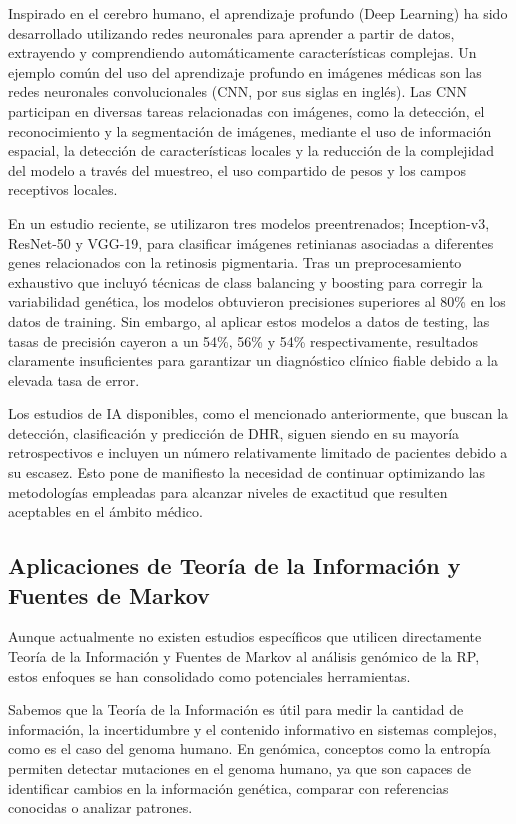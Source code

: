 \documentclass[11pt,spanish,listoffigures,listoftables]{tfgetsinf}
\begin{document}
Inspirado en el cerebro humano, el aprendizaje profundo (Deep Learning) ha sido desarrollado utilizando redes neuronales para aprender a partir de datos, extrayendo y comprendiendo automáticamente características complejas. Un ejemplo común del uso del aprendizaje profundo en imágenes médicas son las redes neuronales convolucionales (CNN, por sus siglas en inglés). Las CNN participan en diversas tareas relacionadas con imágenes, como la detección, el reconocimiento y la segmentación de imágenes, mediante el uso de información espacial, la detección de características locales y la reducción de la complejidad del modelo a través del muestreo, el uso compartido de pesos y los campos receptivos locales\cite{SHE}.

En un estudio reciente, se utilizaron tres modelos preentrenados; Inception-v3, ResNet-50 y VGG-19, para clasificar imágenes retinianas asociadas a diferentes genes relacionados con la retinosis pigmentaria. Tras un preprocesamiento exhaustivo que incluyó técnicas de class balancing y boosting para corregir la variabilidad genética, los modelos obtuvieron precisiones superiores al 80\% en los datos de training\cite{FER}. Sin embargo, al aplicar estos modelos a datos de testing, las tasas de precisión cayeron a un 54\%, 56\% y 54\% respectivamente, resultados claramente insuficientes para garantizar un diagnóstico clínico fiable debido a la elevada tasa de error.

Los estudios de IA disponibles, como el mencionado anteriormente, que buscan la detección, clasificación y predicción de DHR, siguen siendo en su mayoría retrospectivos e incluyen un número relativamente limitado de pacientes debido a su escasez\cite{ISS}. Esto pone de manifiesto la necesidad de continuar optimizando las metodologías empleadas para alcanzar niveles de exactitud que resulten aceptables en el ámbito médico.

\subsection{Aplicaciones de Teoría de la Información y Fuentes de Markov}

Aunque actualmente no existen estudios específicos que utilicen directamente Teoría de la Información y Fuentes de Markov al análisis genómico de la RP, estos enfoques se han consolidado como potenciales herramientas.

Sabemos que la Teoría de la Información es útil para medir la cantidad de información, la incertidumbre y el contenido informativo en sistemas complejos, como es el caso del genoma humano. En genómica, conceptos como la entropía permiten detectar mutaciones en el genoma humano, ya que son capaces de identificar cambios en la información genética, comparar con referencias conocidas o analizar patrones\cite{SEC}.
\end{document}
